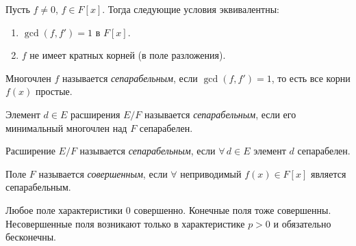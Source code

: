 \begin{cor}
    Пусть $f \neq 0$, $f \in F[x]$. Тогда следующие условия эквивалентны:
    \begin{enumerate}
        \item $\gcd(f, f') = 1$ в $F[x]$.
        \item $f$ не имеет кратных корней (в поле разложения).
    \end{enumerate}
\end{cor}


\begin{definition}
    Многочлен $f$ называется \emph{сепарабельным}, если $\gcd(f, f') = 1$, то есть все корни $f(x)$ простые.

\end{definition}

\begin{definition}
    Элемент $d \in E$ расширения $E/F$ называется \emph{сепарабельным}, если его минимальный многочлен над
    $F$ сепарабелен.
\end{definition}

\begin{definition}
    Расширение $E/F$ называется \emph{сепарабельным}, если $\forall\, d \in E$ элемент $d$ сепарабелен.

\end{definition}

\begin{definition}
    Поле $F$ называется \emph{совершенным}, если $\forall$ неприводимый $f(x) \in F[x]$ является сепарабельным.

\end{definition}

\begin{remark}
    Любое поле характеристики $0$ совершенно. Конечные поля тоже совершенны. Несовершенные поля возникают только в характеристике
    $p > 0$ и обязательно бесконечны.
\end{remark}
